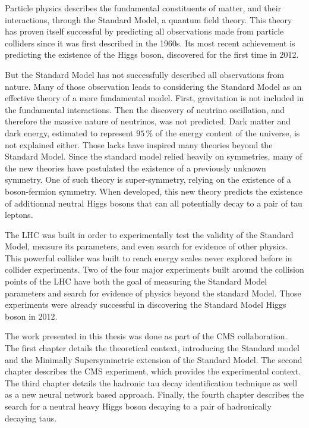 Particle physics describes the fundamental constituents of matter, and their interactions, through the Standard Model, a quantum field theory. This theory has proven itself successful by predicting all observations made from particle colliders since it was first described in the 1960s. Its most recent achievement is predicting the existence of the Higgs boson, discovered for the first time in 2012.

But the Standard Model has not successfully described all observations from nature. Many of those observation leads to considering the Standard Model as an effective theory of a more fundamental model.  First, gravitation is not included in the fundamental interactions. Then the discovery of neutrino oscillation, and therefore the massive nature of neutrinos, was not predicted. Dark matter and dark energy, estimated to represent $95\,\%$ of the energy content of the universe, is not explained either. Those lacks have inspired many theories beyond the Standard Model. Since the standard model relied heavily on symmetries, many of the new theories have postulated the existence of a previously unknown symmetry. One of such theory is super-symmetry, relying on the existence of a boson-fermion symmetry. When developed, this new theory predicts the existence of additionnal neutral Higgs bosons that can all potentially decay to a pair of tau leptons.

The LHC was built in order to experimentally test the validity of the Standard Model, measure its parameters, and even search for evidence of other physics. This powerful collider was built to reach energy scales never explored before in collider experiments. Two of the four major experiments built around the collision points of the LHC have both the goal of measuring the Standard Model parameters and  search for evidence of physics beyond the standard Model. Those experiments were already successful in discovering the Standard Model Higgs boson in 2012.

The work presented in this thesis was done as part of the CMS collaboration. The first chapter details the theoretical context, introducing the Standard model and the Minimally Supersymmetric extension of the Standard Model. The second chapter describes the CMS experiment, which provides the experimental context. The third chapter details the hadronic tau decay identification technique as well as a new neural network based approach. Finally, the fourth chapter describes the search for a neutral heavy Higgs boson decaying to a pair of hadronically decaying taus.